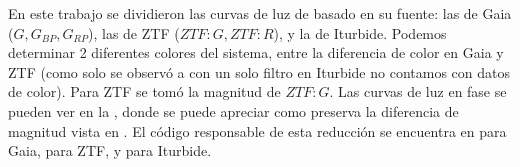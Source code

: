 En este trabajo se dividieron las curvas de luz de \atoObjId basado en su
fuente: las de Gaia ($G, G_{BP}, G_{RP}$), las de ZTF ($ZTF:G, ZTF:R$), y la de
Iturbide. Podemos determinar 2 diferentes colores del sistema, entre la
diferencia de color en Gaia y ZTF (como solo se observó a \atoObjId con un solo
filtro en Iturbide no contamos con datos de color). Para ZTF se tomó la
magnitud de $ZTF:G$. Las curvas de luz en fase se pueden ver en la
, donde se puede apreciar como preserva la
diferencia de magnitud vista en . El
código responsable de esta reducción se encuentra en
\href{https://github.com/KnightIV/UANL_MAPTA_Observaciones/blob/main/analisis/gaia/light_curves.ipynb}{}
para Gaia,
\href{https://github.com/KnightIV/UANL_MAPTA_Observaciones/blob/main/analisis/ztf/light-curve-processing.ipynb}{}
para ZTF, y
\href{https://github.com/KnightIV/UANL_MAPTA_Observaciones/blob/main/analisis/iturbide/iraf/qphot_timeseries_analysis.ipynb}{}
para Iturbide.

